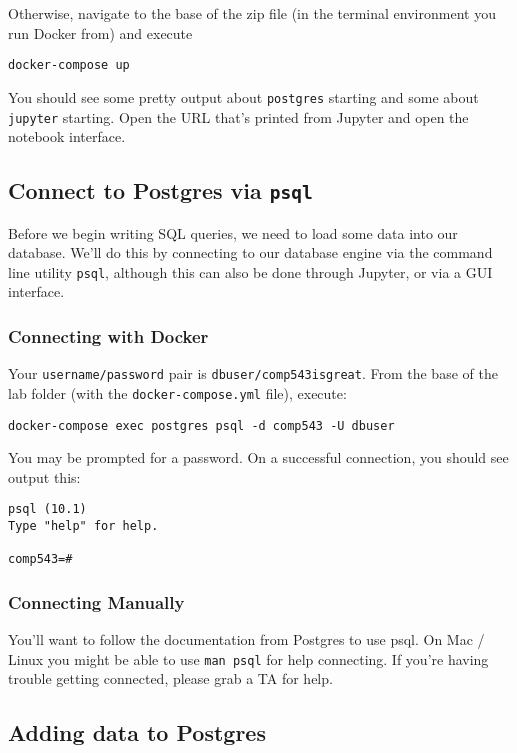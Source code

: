 \documentclass[paper=letter, fontsize=12pt]{article}
\numberwithin{equation}{section}
\numberwithin{figure}{section}
\numberwithin{table}{section}
\begin{document}
Otherwise, navigate to the base of the zip file (in the terminal
environment you run Docker from) and execute

\begin{verbatim}
docker-compose up 
\end{verbatim}

You should see some pretty output about \texttt{postgres} starting and some
about \texttt{jupyter} starting. Open the URL that's printed from Jupyter and
open the notebook interface.

\subsection{Connect to Postgres via \texttt{psql}}

Before we begin writing SQL queries, we need to load some data into our
database.  We'll do this by connecting to our database engine via the command
line utility \texttt{psql}, although this can also be done through Jupyter, or
via a GUI interface.

\subsubsection{Connecting with Docker}
Your \texttt{username/password} pair is \texttt{dbuser/comp543isgreat}.  From
the base of the lab folder (with the \texttt{docker-compose.yml} file),
execute:

\begin{verbatim}
docker-compose exec postgres psql -d comp543 -U dbuser
\end{verbatim}

You may be prompted for a password.  On a successful connection, you should
see output this:

\begin{verbatim}
psql (10.1)
Type "help" for help.

comp543=# 
\end{verbatim}

\subsubsection{Connecting Manually}

You'll want to follow the documentation from Postgres to use psql.  On Mac /
Linux you might be able to use \texttt{man psql} for help connecting.  If
you're having trouble getting connected, please grab a TA for help.

\subsection{Adding data to Postgres}
\end{document}
